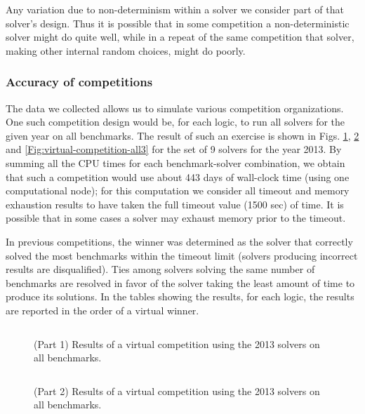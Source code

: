 \documentclass[smallcondensed]{svjour3}
\begin{document}
Any variation due to non-determinism within a solver we consider part of that solver's design. Thus it is possible that in some competition a non-deterministic solver might do quite well, while in a repeat of the same competition that solver, making other internal random choices, might do poorly. 

\subsubsection{Accuracy of competitions}
\label{BenchmarkSelection}
The data we collected allows us to simulate various competition organizations. One such competition design would be, for each logic, to run all solvers for the given year on all benchmarks. The result of such an exercise is shown in Figs. \ref{Fig:virtual-competition-all}, \ref{Fig:virtual-competition-all2} and \ref{Fig:virtual-competition-all3} for the set of 9 solvers for the year 2013. By summing all the CPU times for each benchmark-solver combination, we obtain that such a competition would use about 443 days of wall-clock time (using one computational node); for this computation we consider all timeout and memory exhaustion results to have taken the full timeout value (1500 sec) of time. It is possible that in some cases a solver may exhaust memory prior to the timeout.

In previous competitions, the winner was determined as the solver that correctly solved the most benchmarks within the timeout limit (solvers producing incorrect results are disqualified). Ties among solvers solving the same number of benchmarks are resolved in favor of the solver taking the least amount of time to produce its solutions. In the tables showing the results, for each logic, the results are reported in the order of a virtual winner.

\begin{figure}
\centering
\begin{tabular}{|p{.01in}rrl|}
\hline

\end{tabular}
\caption{(Part 1) Results of a virtual competition using the 2013 solvers on all benchmarks.}
\label{Fig:virtual-competition-all}
\end{figure}

\begin{figure}
\centering
\begin{tabular}{|p{.01in}rrl|}
\hline

\end{tabular}
\caption{(Part 2) Results of a virtual competition using the 2013 solvers on all benchmarks.}
\label{Fig:virtual-competition-all2}
\end{figure}
\end{document}

